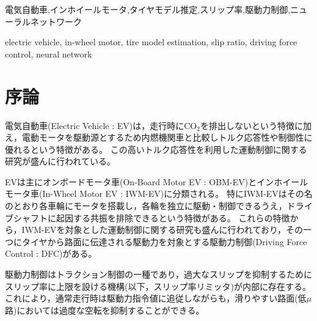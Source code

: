 \documentclass[dvipdfmx,usejistfm]{ieej-tec2}
\begin{document}
\begin{jkeyword}
電気自動車,インホイールモータ,タイヤモデル推定,スリップ率,駆動力制御,ニューラルネットワーク
\end{jkeyword}

\begin{ekeyword}
electric vehicle, in-wheel motor, tire model estimation, slip ratio, driving force control, neural network
\end{ekeyword}

\begin{abstract}
This paper proposes a method for estimating the optimal slip ratio for electric vehicle driving force control. The method estimates the tire-road $\mu$--$\lambda$ curve in real time from partially observed data using a machine learning model and derives the optimal slip ratio from its peak. Online vehicle experiments demonstrate the effectiveness of the proposed method.
\end{abstract}

\maketitle

\section{序論}

電気自動車(Electric Vehicle : EV)は，走行時にCO$_2$を排出しないという特徴\cite{oki}に加え，電動モータを駆動源とするため内燃機関車と比較しトルク応答性や制御性に優れるという特徴がある\cite{yoshimoto}。
この高いトルク応答性を利用した運動制御に関する研究が盛んに行われている\cite{takahashi}。

EVは主にオンボードモータ車(On-Board Motor EV : OBM-EV)とインホイールモータ車(In-Wheel Motor EV : IWM-EV)に分類される。
特にIWM-EVはその名のとおり各車輪にモータを搭載し，各輪を独立に駆動・制御できるうえ，ドライブシャフトに起因する共振を排除できるという特徴がある。
これらの特徴から，IWM-EVを対象とした運動制御に関する研究も盛んに行われており，その一つにタイヤから路面に伝達される駆動力を対象とする駆動力制御(Driving Force Control : DFC)がある\cite{yoshimura}。

駆動力制御はトラクション制御の一種であり，過大なスリップを抑制するためにスリップ率に上限を設ける機構(以下，スリップ率リミッタ)が内部に存在する。
これにより，通常走行時は駆動力指令値に追従しながらも，滑りやすい路面(低$\mu$路)においては過度な空転を抑制することができる。
\end{document}
